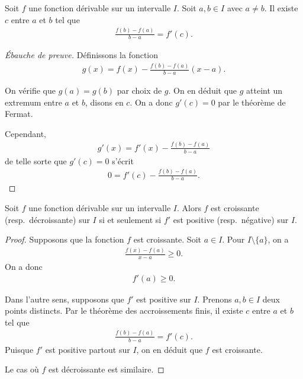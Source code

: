 \documentclass[main.tex]{subfiles}
\begin{document}
\begin{proposition}

    Soit $f$ une fonction dérivable sur un intervalle $I$.
    Soit $a,b \in I$ avec $a \neq b$.
    Il existe $c$ entre $a$ et $b$ tel que
    \begin{align}
        \frac {f(b) - f(a)} {b - a} = f'(c).
    \end{align}
\end{proposition}
\begin{proof}[Ébauche de preuve]
    Définissons la fonction
    \begin{align}
        g(x) = f(x) - \frac {f(b) - f(a)} {b - a} (x - a).
    \end{align}

    On vérifie que $g(a) = g(b)$ par choix de $g$.
    On en déduit que $g$ atteint un extremum entre $a$ et $b$,
    disons en $c$.
    On a donc $g'(c) = 0$ par le théorème de Fermat.

    Cependant,
    \begin{align}
        g'(x) = f'(x) - \frac {f(b) - f(a)} {b - a}
    \end{align}
    de telle sorte que $g'(c) = 0$ s'écrit
    \begin{align}
        0 = f'(c) - \frac {f(b) - f(a)} {b - a}.
    \end{align}
\end{proof}

\begin{proposition}
    Soit $f$ une fonction dérivable sur un intervalle $I$.
    Alors $f$ est croissante (resp.\ décroissante) sur $I$
    si et seulement si
    $f'$ est positive (resp.\ négative) sur $I$.
\end{proposition}
\begin{proof}
    Supposons que la fonction $f$ est croissante.
    Soit $a \in I$.
    Pour $ I \setminus \{a\}$, on a
    \begin{align}
        \frac{f(x) - f(a)}{x - a} \ge 0.
    \end{align}
    On a donc
    \begin{align}
        f'(a) \ge 0.
    \end{align}

    Dans l'autre sens, supposons que $f'$ est positive sur $I$.
    Prenons $a,b \in I$ deux points distincts.
    Par le théorème des accroissements finis,
    il existe $c$ entre $a$ et $b$ tel que
    \begin{align}
        \frac{f(b) - f(a)}{b - a} = f'(c).
    \end{align}
    Puisque $f'$ est positive partout sur $I$,
    on en déduit que $f$ est croissante.

    Le cas où $f$ est décroissante est similaire.
\end{proof}
\end{document}
